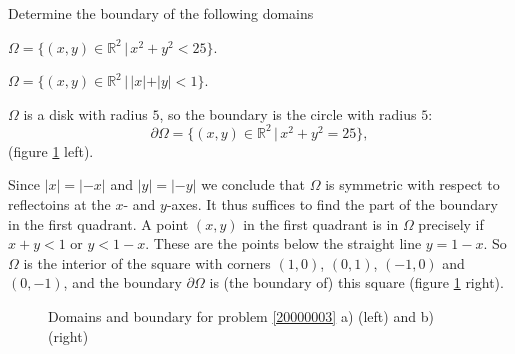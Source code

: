 Determine the boundary of the following domains
\begin{teilaufgaben}
\item
$\Omega=\{(x,y)\in\mathbb R^2\,|\, x^2+y^2<25\}$.
\item
$\Omega=\{(x,y)\in\mathbb R^2\,|\, |x|+|y|<1\}$.
\end{teilaufgaben}

\begin{loesung}
\begin{teilaufgaben}
\item
$\Omega$ is a disk with radius $5$, so the boundary is
the circle with radius $5$:
\[
\partial\Omega=\{(x,y)\in\mathbb R^2\,|\, x^2+y^2=25\},
\]
(figure \ref{20000003:fig} left).
\item
Since $|x|=|-x|$ and $|y|=|-y|$ we conclude that $\Omega$ is symmetric
with respect to reflectoins at the $x$- and $y$-axes.
It thus suffices to find the part of the boundary in the first quadrant.
A point $(x,y)$ in the first quadrant is in $\Omega$ precisely
if $x+y<1$ or $y<1-x$.
These are the points below the straight line $y=1-x$.
So $\Omega$ is the interior of the square with corners
$(1,0)$, $(0,1)$, $(-1,0)$ and $(0,-1)$,
and the boundary $\partial\Omega$ is (the boundary of) this square
(figure \ref{20000003:fig} right).
\qedhere
\end{teilaufgaben}
\begin{figure}
\begin{center}
\qquad
{}
\end{center}
\caption{Domains and boundary for problem \ref{20000003} a) (left)
and b) (right)\label{20000003:fig}}
\end{figure}
\end{loesung}
